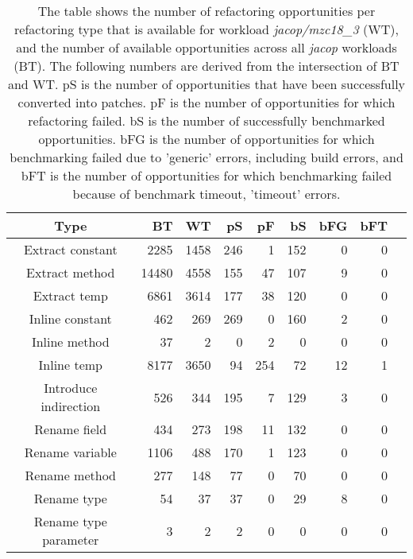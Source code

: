 \begin{table}[!h]
\caption{The table shows the number of refactoring opportunities per refactoring type that is available for workload \textit{jacop/mzc18\_3} (WT), and the number of available opportunities across all \textit{jacop} workloads (BT). The following numbers are derived from the intersection of BT and WT. pS is the number of opportunities that have been successfully converted into patches. pF is the number of opportunities for which refactoring failed. bS is the number of successfully benchmarked opportunities. bFG is the number of opportunities for which benchmarking failed due to 'generic' errors, including build errors, and bFT is the number of opportunities for which benchmarking failed because of benchmark timeout, 'timeout' errors.}
\begin{tabular}{c|*{7}{r}r}
Type&BT&WT&pS&pF&bS&bFG&bFT\\
\hline
Extract constant&2285&1458&246&1&152&0&0\\
Extract method&14480&4558&155&47&107&9&0\\
Extract temp&6861&3614&177&38&120&0&0\\
Inline constant&462&269&269&0&160&2&0\\
Inline method&37&2&0&2&0&0&0\\
Inline temp&8177&3650&94&254&72&12&1\\
Introduce indirection&526&344&195&7&129&3&0\\
Rename field&434&273&198&11&132&0&0\\
Rename variable&1106&488&170&1&123&0&0\\
Rename method&277&148&77&0&70&0&0\\
Rename type&54&37&37&0&29&8&0\\
Rename type parameter&3&2&2&0&0&0&0\\
\end{tabular}
\end{table}
